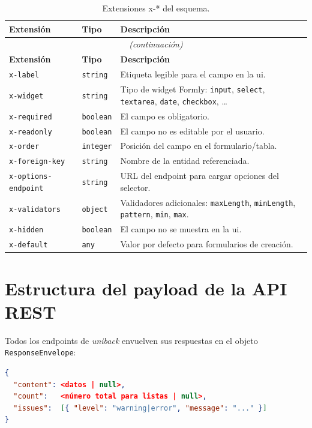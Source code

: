 \begin{longtable}{lp{4cm}p{6cm}}
  \caption{Extensiones x-* del esquema.} \label{tab:xextensions} \\
  \toprule
  \textbf{Extensión} & \textbf{Tipo} & \textbf{Descripción} \\
  \midrule
  \endfirsthead
  \multicolumn{3}{c}{\textit{(continuación)}} \\
  \toprule
  \textbf{Extensión} & \textbf{Tipo} & \textbf{Descripción} \\
  \midrule
  \endhead
  \bottomrule
  \endfoot
  \texttt{x-label} & \texttt{string} & Etiqueta legible para el campo en la \gls{ui}. \\
  \texttt{x-widget} & \texttt{string} & Tipo de widget Formly: \texttt{input},
    \texttt{select}, \texttt{textarea}, \texttt{date}, \texttt{checkbox}, \ldots \\
  \texttt{x-required} & \texttt{boolean} & El campo es obligatorio. \\
  \texttt{x-readonly} & \texttt{boolean} & El campo no es editable por el usuario. \\
  \texttt{x-order} & \texttt{integer} & Posición del campo en el formulario/tabla. \\
  \texttt{x-foreign-key} & \texttt{string} & Nombre de la entidad referenciada. \\
  \texttt{x-options-endpoint} & \texttt{string} & URL del endpoint para cargar opciones
    del selector. \\
  \texttt{x-validators} & \texttt{object} & Validadores adicionales: \texttt{maxLength},
    \texttt{minLength}, \texttt{pattern}, \texttt{min}, \texttt{max}. \\
  \texttt{x-hidden} & \texttt{boolean} & El campo no se muestra en la \gls{ui}. \\
  \texttt{x-default} & \texttt{any} & Valor por defecto para formularios de creación. \\
\end{longtable}


\chapter{Estructura del payload de la API REST}
\label{ap:api}

Todos los endpoints de \textit{uniback} envuelven sus respuestas en el objeto
\texttt{ResponseEnvelope}:

\begin{lstlisting}[language=json, caption={Estructura de ResponseEnvelope.}]
{
  "content": <datos | null>,
  "count":   <número total para listas | null>,
  "issues":  [{ "level": "warning|error", "message": "..." }]
}
\end{lstlisting}

